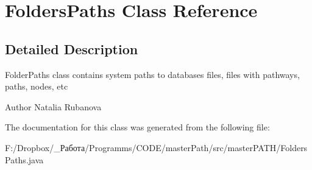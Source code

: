 \section{Folders\+Paths Class Reference}
\label{classmaster_p_a_t_h_1_1_folders_paths}


\subsection{Detailed Description}
Folder\+Paths class contains system paths to databases files, files with pathways, paths, nodes, etc

\begin{DoxyAuthor}{Author}
Natalia Rubanova 
\end{DoxyAuthor}


The documentation for this class was generated from the following file\+:\begin{DoxyCompactItemize}
\item 
F\+:/\+Dropbox/\+\_\+Работа/\+Programms/\+C\+O\+D\+E/master\+Path/src/master\+P\+A\+T\+H/Folders\+Paths.\+java\end{DoxyCompactItemize}
